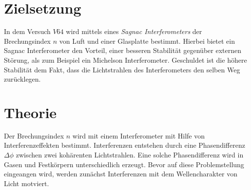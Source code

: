\setcounter{page}{1}
\section*{Zielsetzung}
In dem Versuch $V64$ wird mittels eines \emph{Sagnac Interferometers}
der Brechungsindex $n$ von Luft und einer Glasplatte bestimmt.
Hierbei bietet ein Sagnac Interferometer den Vorteil, einer
besseren Stabilität gegenüber externen Störung, als zum Beispiel
ein Michelson Interferometer. Geschuldet ist die höhere Stabilität
dem Fakt, dass die Lichtstrahlen des Interferometers den selben Weg zurücklegen.

\section{Theorie}
Der Brechungsindex $n$ wird mit einem Interferometer mit Hilfe von
Interferenzeffekten bestimmt. Interferenzen entstehen durch
eine Phasendifferenz $\Delta\phi$ zwischen zwei kohärenten Lichtstrahlen.
Eine solche Phasendifferenz wird in Gasen und Festkörpern unterschiedlich erzeugt.
Bevor auf diese Problemstellung eingeangen wird, werden zunächst Interferenzen
mit dem Wellencharakter von Licht motviert.
